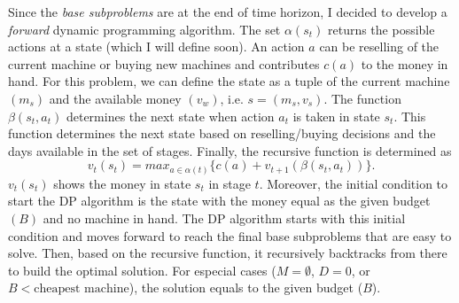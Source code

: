 \documentclass{article}
\begin{document}
Since the \emph{base subproblems} are at the end of time horizon, I decided to develop a \emph{forward} dynamic programming algorithm.
The set $\alpha(s_t)$ returns the possible actions at a state (which I will define soon). An action $a$ can be reselling of the current machine or buying new machines and contributes $c(a)$ to the money in hand.
For this problem, we can define the state as a tuple of the current machine $(m_s)$ and the available money $(v_w)$, i.e. $s = (m_s, v_s)$.
The function $\beta(s_t, a_t)$ determines the next state when action $a_t$ is taken in state $s_t$.
This function determines the next state based on reselling/buying decisions and the days available in the set of stages.
Finally, the recursive function is determined as
$$v_t(s_t) = max_{a \in \alpha(t)}\{c(a) + v_{t+1}(\beta(s_t,a_t))\}.$$
$v_t(s_t)$ shows the money in state $s_t$ in stage $t$. 
Moreover, the initial condition to start the DP algorithm is the state with the money equal as the given budget $(B)$ and no machine in hand. 
The DP algorithm starts with this initial condition and moves forward to reach the final base subproblems that are easy to solve. Then, based on the recursive function, it recursively backtracks from there to build the optimal solution. For especial cases ($M=\emptyset$, $D=0$, or $B < \text{cheapest machine}$), the solution equals to the given budget ($B$).
\end{document}
